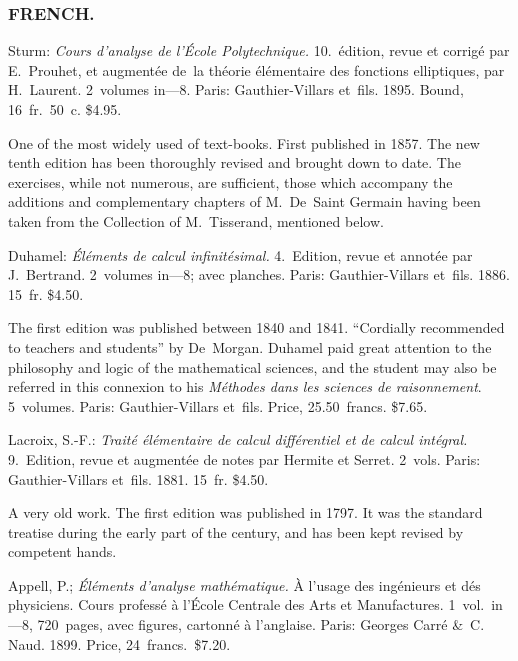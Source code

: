 \documentclass[12pt]{book}[2005/09/16]
\newlength{\ParIndent}
\newenvironment{Book}{\medskip\par\noindent\hangindent\ParIndent\ignorespaces}{\par}
\newenvironment{Descrip}{%
  \begin{list}{}{%
      \setlength{\leftmargin}{1.5\ParIndent}%
      \setlength{\itemindent}{\ParIndent}%
      \setlength{\listparindent}{\ParIndent}%
      \setlength{\topsep}{4pt}%
      \item\small\ignorespaces%
  }%
}{%
\end{list}}
\newcommand{\BibSubsect}[1]{%
  \subsubsection*{\centering\footnotesize\normalfont\MakeUppercase{#1}}
}
\newcommand{\Pagelabel}[1]{\phantomsection\label{page:#1}}
\newcommand{\PageSep}[1]{\Pagelabel{#1}\ignorespaces}
\renewcommand{\(}{{\upshape(}}
\renewcommand{\)}{{\upshape)}}
\newcommand{\Title}[1]{\textit{#1}}
\begin{document}
\BibSubsect{French.}

\begin{Book}
Sturm: \Title{Cours d'analyse de l'École Polytechnique.} 10.~édition,
revue et corrigé par E.~Prouhet, et augmentée de~la théorie
élémentaire des fonctions elliptiques, par H.~Laurent. 2~volumes
in---8. Paris: Gauthier-Villars et~fils. 1895. Bound,
16~fr.\ 50~c. \$4.95.

\begin{Descrip}
One of the most widely used of text-books. First published in
1857. The new tenth edition has been thoroughly revised and brought
down to date. The exercises, while not numerous, are sufficient, those
which accompany the additions and complementary chapters of M.~De~Saint
Germain having been taken from the Collection of M.~Tisserand,
mentioned below.
\end{Descrip}
\end{Book}

\begin{Book}
Duhamel: \Title{Éléments de calcul infinitésimal.} 4.~Edition, revue et
annotée par J.~Bertrand. 2~volumes in---8; avec planches.
Paris: Gauthier-Villars et~fils. 1886. 15~fr. \$4.50.

\begin{Descrip}
The first edition was published between 1840 and 1841. ``Cordially
recommended to teachers and students'' by De~Morgan. Duhamel
paid great attention to the philosophy and logic of the mathematical
sciences, and the student may also be referred in this connexion to
his \Title{Méthodes dans les sciences de raisonnement}. 5~volumes. Paris:
Gauthier-Villars et~fils. Price, 25.50~francs. \$7.65.
\end{Descrip}
\end{Book}

\begin{Book}
Lacroix, S.-F.: \Title{Traité élémentaire de calcul différentiel et de
calcul intégral.} 9.~Edition, revue et augmentée de notes par
Hermite et Serret. 2~vols. Paris: Gauthier-Villars et~fils.
1881. 15~fr. \$4.50.

\begin{Descrip}
A very old work. The first edition was published in 1797. It was
the standard treatise during the early part of the century, and has
been kept revised by competent hands.
\end{Descrip}
\end{Book}
\PageSep{138}

\begin{Book}
Appell, P.; \Title{Éléments d'analyse mathématique.} À l'usage des
ingénieurs et dés physiciens. Cours professé à l'École Centrale
des Arts et Manufactures. 1~vol.\ in---8, 720~pages, avec
figures, cartonné à l'anglaise. Paris: Georges Carré \&~C.
Naud. 1899. Price, 24~francs.\ \$7.20.
\end{Book}
\end{document}
